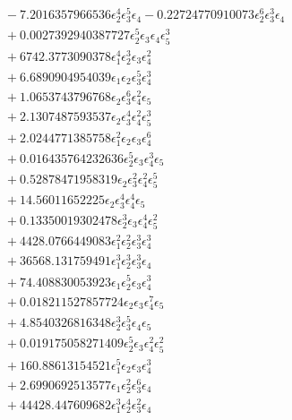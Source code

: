 \documentclass[10pt]{article}
\begin{document}
\begin{align*}
&{}  - 7.2016357966536 \epsilon_{2}^{4} \epsilon_{3}^{5} \epsilon_{4} - 0.22724770910073 \epsilon_{2}^{6} \epsilon_{3}^{3} \epsilon_{4} \\
&{}  + 0.0027392940387727 \epsilon_{2}^{5} \epsilon_{3} \epsilon_{4} \epsilon_{5}^{3} \\
&{}  + 6742.3773090378 \epsilon_{1}^{4} \epsilon_{2}^{3} \epsilon_{3} \epsilon_{4}^{2} \\
&{}  + 6.6890904954039 \epsilon_{1} \epsilon_{2} \epsilon_{3}^{5} \epsilon_{4}^{3} \\
&{}  + 1.0653743796768 \epsilon_{2} \epsilon_{3}^{6} \epsilon_{4}^{2} \epsilon_{5} \\
&{}  + 2.1307487593537 \epsilon_{2} \epsilon_{3}^{4} \epsilon_{4}^{2} \epsilon_{5}^{3} \\
&{}  + 2.0244771385758 \epsilon_{1}^{2} \epsilon_{2} \epsilon_{3} \epsilon_{4}^{6} \\
&{}  + 0.016435764232636 \epsilon_{2}^{5} \epsilon_{3} \epsilon_{4}^{3} \epsilon_{5} \\
&{}  + 0.52878471958319 \epsilon_{2} \epsilon_{3}^{2} \epsilon_{4}^{2} \epsilon_{5}^{5} \\
&{}  + 14.56011652225 \epsilon_{2} \epsilon_{3}^{4} \epsilon_{4}^{4} \epsilon_{5} \\
&{}  + 0.13350019302478 \epsilon_{2}^{3} \epsilon_{3} \epsilon_{4}^{4} \epsilon_{5}^{2} \\
&{}  + 4428.0766449083 \epsilon_{1}^{2} \epsilon_{2}^{2} \epsilon_{3}^{3} \epsilon_{4}^{3} \\
&{}  + 36568.131759491 \epsilon_{1}^{3} \epsilon_{2}^{3} \epsilon_{3}^{3} \epsilon_{4} \\
&{}  + 74.408830053923 \epsilon_{1} \epsilon_{2}^{5} \epsilon_{3} \epsilon_{4}^{3} \\
&{}  + 0.018211527857724 \epsilon_{2} \epsilon_{3} \epsilon_{4}^{7} \epsilon_{5} \\
&{}  + 4.8540326816348 \epsilon_{2}^{3} \epsilon_{3}^{5} \epsilon_{4} \epsilon_{5} \\
&{}  + 0.019175058271409 \epsilon_{2}^{5} \epsilon_{3} \epsilon_{4}^{2} \epsilon_{5}^{2} \\
&{}  + 160.88613154521 \epsilon_{1}^{5} \epsilon_{2} \epsilon_{3} \epsilon_{4}^{3} \\
&{}  + 2.6990692513577 \epsilon_{1} \epsilon_{2}^{2} \epsilon_{3}^{6} \epsilon_{4} \\
&{}  + 44428.447609682 \epsilon_{1}^{3} \epsilon_{2}^{4} \epsilon_{3}^{2} \epsilon_{4} \\

\end{align*}
\end{document}
